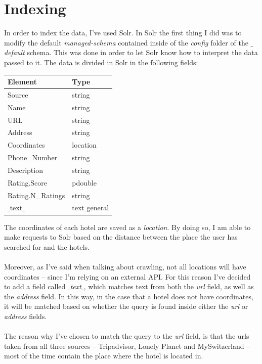 \documentclass[unicode,11pt,a4paper,oneside,numbers=endperiod,openany]{scrartcl}
\begin{document}
\section{Indexing}
In order to index the data, I've used Solr. In Solr the first thing I did was to modify the default \textit{managed-schema} contained inside of the \textit{config} folder of the \textit{$\_$default} schema. This was done in order to let Solr know how to interpret the data passed to it. The data is divided in Solr in the following fields:

\begin{table}[H]
	\centering
	\begin{tabular}{|l|l|} \hline 
		\textbf{Element} & \textbf{Type}  \\ \hline
		Source & string \\
		Name & string \\
		URL & string \\
		Address & string \\
		Coordinates & location \\
		Phone\_Number & string \\
		Description & string \\
		Rating.Score & pdouble \\
		Rating.N\_Ratings & string \\
		$\_$text$\_$ & text$\_$general \\
		\hline
	\end{tabular}
\end{table}
\noindent The coordinates of each hotel are saved as a \textit{location}. By doing so, I am able to make requests to Solr based on the distance between the place the user has searched for and the hotels. \\ \\
Moreover, as I've said when talking about crawling, not all locations will have coordinates -- since I'm relying on an external API. For this reason I've decided to add a field called \textit{$\_$text$\_$}, which matches text from both the \textit{url} field, as well as the \textit{address} field. In this way, in the case that a hotel does not have coordinates, it will be matched based on whether the query is found inside either the \textit{url} or \textit{address} fields. \\ \\
The reason why I've chosen to match the query to the \textit{url} field, is that the urls taken from all three sources -- Tripadvisor, Lonely Planet and MySwitzerland -- most of the time contain the place where the hotel is located in.
\end{document}
